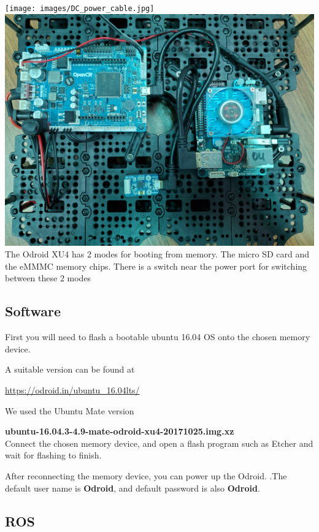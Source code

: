\documentclass[12]{article}
\begin{document}
\texttt{[image: images/DC\_power\_cable.jpg]}\\


\includegraphics[width=0.7\linewidth]{images/ODROID_top.jpg}\\

           


The Odroid XU4 has 2 modes for booting from memory. The micro SD card and the eMMMC memory chips. There is a switch near the power port for switching between these 2 modes


\subsection{Software}


First you will need to flash a bootable ubuntu 16.04 OS onto the chosen memory device.

A suitable version can be found at

 \url{

  https://odroid.in/ubuntu_16.04lts/}



We used the Ubuntu Mate version


 \textbf{ubuntu-16.04.3-4.9-mate-odroid-xu4-20171025.img.xz}\\


Connect the chosen memory device, and open a flash program such as Etcher and wait for flashing to finish.

After reconnecting the memory device, you can power up the Odroid. .The default user name is \textbf{Odroid}, and default password is also \textbf{Odroid}.\\


\subsection{ROS}
\end{document}
